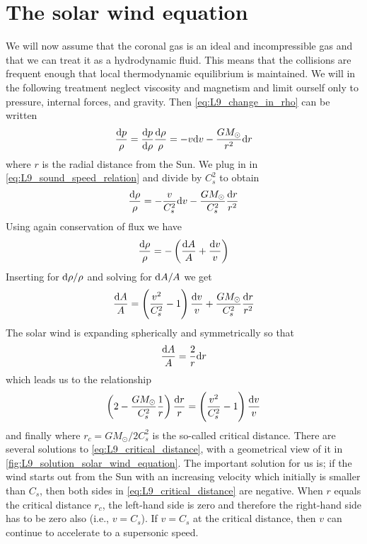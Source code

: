 \section{The solar wind equation}
We will now assume that the coronal gas is an ideal and incompressible gas and that we can treat it as a hydrodynamic fluid. This means that the collisions are frequent enough that local thermodynamic equilibrium is maintained. We will in the following treatment neglect viscosity and magnetism and limit ourself only to pressure, internal forces, and gravity. Then \cref{eq:L9_change_in_rho} can be written
\begin{equation*}
    \frac{\tn{d}p}{\rho}=\fracd[\rho]{p}\frac{\tn{d}\rho}{\rho}=-v\tn{d}v-\frac{GM_\odot}{r^2}\tn{d}r
\end{equation*}
where \(r\) is the radial distance from the Sun. We plug in in \cref{eq:L9_sound_speed_relation} and divide by \(C_s^2\) to obtain
\begin{equation*}
    \frac{\tn{d}\rho}{\rho}=-\frac{v}{C_s^2}\tn{d}v-\frac{GM_\odot}{C_s^2}\frac{\tn{d}r}{r^2}
\end{equation*}
Using again conservation of flux we have
\begin{equation*}
    \frac{\tn{d}\rho}{\rho}=-\left(\frac{\tn{d}A}{A}+\frac{\tn{d}v}{v}\right)
\end{equation*}
Inserting for \(\tn{d}\rho/\rho \) and solving for \(\tn{d}A/A\) we get
\begin{equation*}
    \frac{\tn{d}A}{A}=\left(\frac{v^2}{C_s^2}-1\right)\frac{\tn{d}v}{v}+\frac{GM_\odot}{C_s^2}\frac{\tn{d}r}{r^2}
\end{equation*}
The solar wind is expanding spherically and symmetrically so that
\begin{equation*}
    \frac{\tn{d}A}{A}=\frac{2}{r}\tn{d}r
\end{equation*}
which leads us to the relationship
\begin{equation*}
    \left(2-\frac{GM_\odot}{C_s^2}\frac{1}{r}\right)\frac{\tn{d}r}{r}=\left(\frac{v^2}{C_s^2}-1\right)\frac{\tn{d}v}{v}
\end{equation*}
and finally
where \(r_c=GM_\odot/2C_s^2\) is the so-called critical distance. There are several solutions to \cref{eq:L9_critical_distance}, with a geometrical view of it in \cref{fig:L9_solution_solar_wind_equation}. The important solution for us is; if the wind starts out from the Sun with an increasing velocity which initially is smaller than \(C_s\), then both sides in \cref{eq:L9_critical_distance} are negative. When \(r\) equals the critical distance \(r_c\), the left-hand side is zero and therefore the right-hand side has to be zero also (i.e., \(v=C_s\)). If \(v=C_s\) at the critical distance, then \(v\) can continue to accelerate to a supersonic speed.
